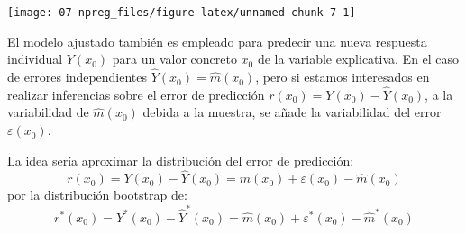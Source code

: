 \documentclass[
]{book}
\theoremstyle{break}
\theoremstyle{definition}
\theoremstyle{definition}
\theoremstyle{definition}
\theoremstyle{definition}
\theoremstyle{remark}
\begin{document}
\begin{center}\texttt{[image: 07-npreg\_files/figure-latex/unnamed-chunk-7-1]} \end{center}

El modelo ajustado también es empleado para predecir una nueva respuesta individual \(Y(x_0)\) para un valor concreto \(x_0\) de la variable explicativa.
En el caso de errores independientes \(\hat{Y}(x_0) = \hat{m}(x_0)\), pero si estamos interesados en realizar inferencias sobre el error de predicción \(r(x_0) = Y(x_0) - \hat{Y}(x_0)\), a la variabilidad de \(\hat{m}(x_0)\) debida a la muestra, se añade la variabilidad del error \(\varepsilon(x_0)\).

La idea sería aproximar la distribución del error de predicción:
\[r(x_0) = Y(x_0) - \hat{Y}(x_0) = m(x_0) + \varepsilon(x_0) - \hat{m}(x_0)\]
por la distribución bootstrap de:
\[r^{\ast}(x_0) = Y^{\ast}(x_0) - \hat{Y}^{\ast}(x_0) = \hat{m}(x_0) + \varepsilon^{\ast}(x_0) - \hat{m}^{\ast}(x_0)\]
\end{document}
